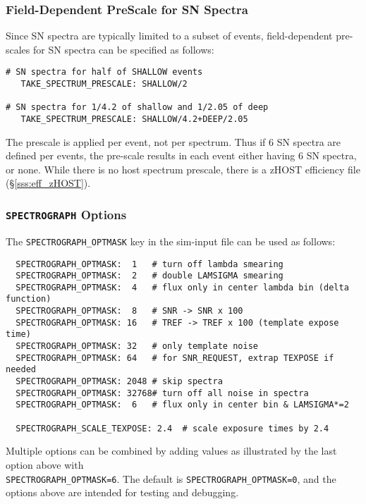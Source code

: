 \documentclass[12pt]{article}
\newcommand{\SPEC}{{\tt SPECTROGRAPH}}
\begin{document}
\subsubsection{Field-Dependent PreScale for SN Spectra}
\label{sss:SPEC_PRESCALE}

Since SN spectra are typically limited to a subset of events,
field-dependent pre-scales for SN spectra can be specified as follows:
%
\begin{verbatim}
# SN spectra for half of SHALLOW events
   TAKE_SPECTRUM_PRESCALE: SHALLOW/2  

# SN spectra for 1/4.2 of shallow and 1/2.05 of deep
   TAKE_SPECTRUM_PRESCALE: SHALLOW/4.2+DEEP/2.05
\end{verbatim}
The prescale is applied per event, not per spectrum.
Thus if 6 SN spectra are defined per events, the pre-scale
results in each event either having 6 SN spectra, or none.
While there is no host spectrum prescale,
there is a zHOST efficiency file
(\S\ref{sss:eff_zHOST}).

\subsubsection{{\SPEC} Options}
\label{sss:SPEC_OPTMASK}

The {\tt SPECTROGRAPH\_OPTMASK} key in the sim-input file
can be used as follows:
%
\begin{verbatim}
  SPECTROGRAPH_OPTMASK:  1   # turn off lambda smearing
  SPECTROGRAPH_OPTMASK:  2   # double LAMSIGMA smearing
  SPECTROGRAPH_OPTMASK:  4   # flux only in center lambda bin (delta function)
  SPECTROGRAPH_OPTMASK:  8   # SNR -> SNR x 100
  SPECTROGRAPH_OPTMASK: 16   # TREF -> TREF x 100 (template expose time)
  SPECTROGRAPH_OPTMASK: 32   # only template noise
  SPECTROGRAPH_OPTMASK: 64   # for SNR_REQUEST, extrap TEXPOSE if needed
  SPECTROGRAPH_OPTMASK: 2048 # skip spectra
  SPECTROGRAPH_OPTMASK: 32768# turn off all noise in spectra
  SPECTROGRAPH_OPTMASK:  6   # flux only in center bin & LAMSIGMA*=2

  SPECTROGRAPH_SCALE_TEXPOSE: 2.4  # scale exposure times by 2.4
\end{verbatim}
%
Multiple options can be combined by adding values
as illustrated by the last option above with \\
{\tt SPECTROGRAPH\_OPTMASK=6}.
The default is {\tt SPECTROGRAPH\_OPTMASK=0},
and the options above are intended for testing and debugging.
\end{document}
